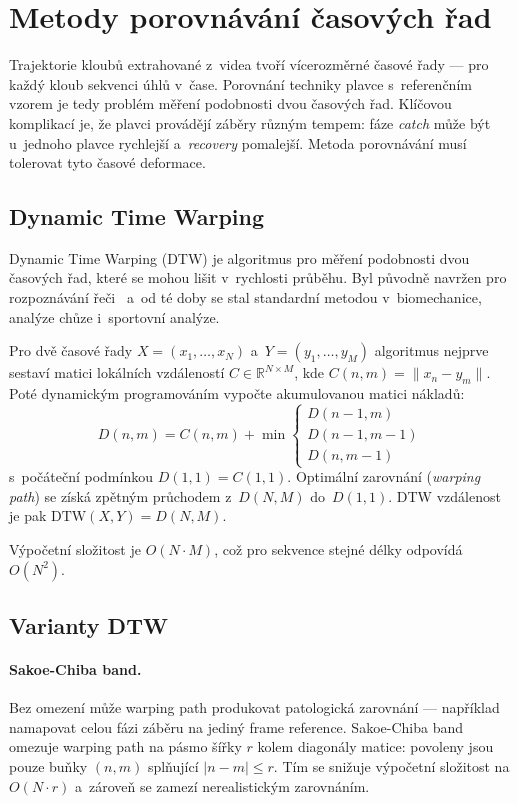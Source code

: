 \section{Metody porovnávání časových řad}
\label{sec:porovnavani_casovych_rad}

Trajektorie kloubů extrahované z~videa tvoří vícerozměrné časové řady --- pro každý kloub sekvenci úhlů v~čase. Porovnání techniky plavce s~referenčním vzorem je tedy problém měření podobnosti dvou časových řad. Klíčovou komplikací je, že plavci provádějí záběry různým tempem: fáze \textit{catch} může být u~jednoho plavce rychlejší a~\textit{recovery} pomalejší. Metoda porovnávání musí tolerovat tyto časové deformace.

\subsection{Dynamic Time Warping}
\label{subsec:dtw}

Dynamic Time Warping (DTW) je algoritmus pro měření podobnosti dvou časových řad, které se mohou lišit v~rychlosti průběhu. Byl původně navržen pro rozpoznávání řeči~\cite{sakoe1978} a~od té doby se stal standardní metodou v~biomechanice, analýze chůze i~sportovní analýze.

Pro dvě časové řady $X = (x_1, \ldots, x_N)$ a~$Y = (y_1, \ldots, y_M)$ algoritmus nejprve sestaví matici lokálních vzdáleností $C \in \mathbb{R}^{N \times M}$, kde $C(n,m) = \|x_n - y_m\|$. Poté dynamickým programováním vypočte akumulovanou matici nákladů:
\begin{equation}
    D(n,m) = C(n,m) + \min \begin{cases}
        D(n-1, m) \\
        D(n-1, m-1) \\
        D(n, m-1)
    \end{cases}
\end{equation}
s~počáteční podmínkou $D(1,1) = C(1,1)$. Optimální zarovnání (\textit{warping path}) se získá zpětným průchodem z~$D(N,M)$ do~$D(1,1)$. DTW vzdálenost je pak $\text{DTW}(X,Y) = D(N,M)$.

Výpočetní složitost je $O(N \cdot M)$, což pro sekvence stejné délky odpovídá $O(N^2)$.

\subsection{Varianty DTW}
\label{subsec:dtw_varianty}

\paragraph{Sakoe-Chiba band.}
Bez omezení může warping path produkovat patologická zarovnání --- například namapovat celou fázi záběru na jediný frame reference. Sakoe-Chiba band~\cite{sakoe1978} omezuje warping path na pásmo šířky $r$ kolem diagonály matice: povoleny jsou pouze buňky $(n,m)$ splňující $|n - m| \leq r$. Tím se snižuje výpočetní složitost na $O(N \cdot r)$ a~zároveň se zamezí nerealistickým zarovnáním.

